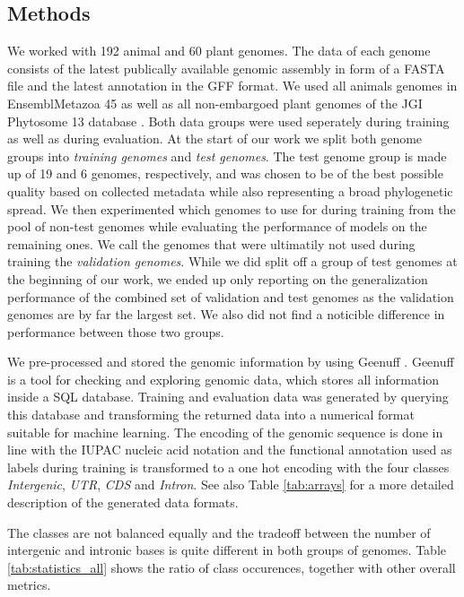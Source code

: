 \documentclass{bioinfo}
\begin{document}
\begin{methods}
\section{Methods}
We worked with 192 animal and 60 plant genomes. The data of each genome consists of the latest publically available genomic assembly in form of a FASTA file and the latest annotation in the GFF format. We used all animals genomes in EnsemblMetazoa 45 \citep{howe2020ensembl} as well as all non-embargoed plant genomes of the JGI Phytosome 13 database \citep{goodstein2012phytozome}. Both data groups were used seperately during training as well as during evaluation. At the start of our work we split both genome groups into {\it training genomes} and {\it test genomes}. The test genome group is made up of 19 and 6 genomes, respectively, and was chosen to be of the best possible quality based on collected metadata while also representing a broad phylogenetic spread. We then experimented which genomes to use for during training from the pool of non-test genomes while evaluating the performance of models on the remaining ones. We call the genomes that were ultimatily not used during training the {\it validation genomes}. While we did split off a group of test genomes at the beginning of our work, we ended up only reporting on the generalization performance of the combined set of validation and test genomes as the validation genomes are by far the largest set. We also did not find a noticible difference in performance between those two groups. 

We pre-processed and stored the genomic information by using Geenuff \citep{denton2019}. Geenuff is a tool for checking and exploring genomic data, which stores all information inside a SQL database. Training and evaluation data was generated by querying this database and transforming the returned data into a numerical format suitable for machine learning. The encoding of the genomic sequence is done in line with the IUPAC nucleic acid notation and the functional annotation used as labels during training is transformed to a one hot encoding with the four classes {\it Intergenic}, {\it UTR}, {\it CDS} and {\it Intron}. See also Table \ref{tab:arrays} for a more detailed description of the generated data formats.

The classes are not balanced equally and the tradeoff between the number of intergenic and intronic bases is quite different in both groups of genomes. Table \ref{tab:statistics_all} shows the ratio of class occurences, together with other overall metrics.


\end{methods}
\end{document}
